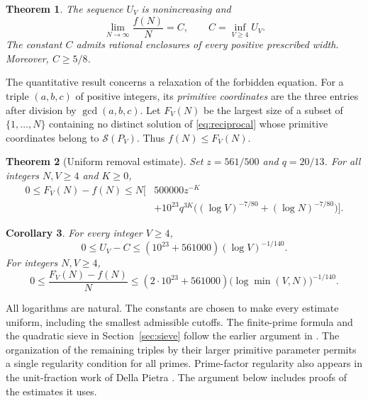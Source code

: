 \documentclass[11pt]{amsart}
\newtheorem{theorem}{Theorem}[section]
\newtheorem{corollary}[theorem]{Corollary}
\theoremstyle{definition}
\theoremstyle{remark}
\numberwithin{equation}{section}
\newcommand{\Sp}{\mathcal S}
\begin{document}
\begin{theorem}\label{thm:density}
The sequence $U_V$ is nonincreasing and
\begin{equation}\label{eq:Cdef}
\lim_{N\to\infty}\frac{f(N)}N=C,
\qquad
C=\inf_{V\ge4}U_V.
\end{equation}
The constant $C$ admits rational enclosures of every positive prescribed width. Moreover, $C\ge5/8$.
\end{theorem}

The quantitative result concerns a relaxation of the forbidden equation.
For a triple $(a,b,c)$ of positive integers, its \emph{primitive coordinates} are the three entries after division by $\gcd(a,b,c)$.
Let $F_V(N)$ be the largest size of a subset of $\{1,\ldots,N\}$ containing no distinct solution of \eqref{eq:reciprocal} whose primitive coordinates belong to $\Sp(P_V)$.
Thus $f(N)\le F_V(N)$.

\begin{theorem}[Uniform removal estimate]\label{thm:removal}
Set $z=561/500$ and $q=20/13$.
For all integers $N,V\ge4$ and $K\ge0$,
\begin{equation}\label{eq:removal}
\begin{split}
0\le F_V(N)-f(N)
\le N\bigl[&500000z^{-K}\\
&+10^{23}q^{3K}\bigl((\log V)^{-7/80}+(\log N)^{-7/80}\bigr)\bigr].
\end{split}
\end{equation}
\end{theorem}

\begin{corollary}\label{cor:rates}
For every integer $V\ge4$,
\begin{equation}\label{eq:outerrate}
0\le U_V-C\le (10^{23}+561000)(\log V)^{-1/140}.
\end{equation}
For integers $N,V\ge4$,
\begin{equation}\label{eq:finiterate}
0\le\frac{F_V(N)-f(N)}N
\le(2\cdot10^{23}+561000)\bigl(\log\min(V,N)\bigr)^{-1/140}.
\end{equation}
\end{corollary}

All logarithms are natural.
The constants are chosen to make every estimate uniform, including the smallest admissible cutoffs.
The finite-prime formula and the quadratic sieve in Section~\ref{sec:sieve} follow the earlier argument in \cite{CGM}.
The organization of the remaining triples by their larger primitive parameter permits a single regularity condition for all primes.
Prime-factor regularity also appears in the unit-fraction work of Della Pietra \cite{DP}.
The argument below includes proofs of the estimates it uses.
\end{document}
